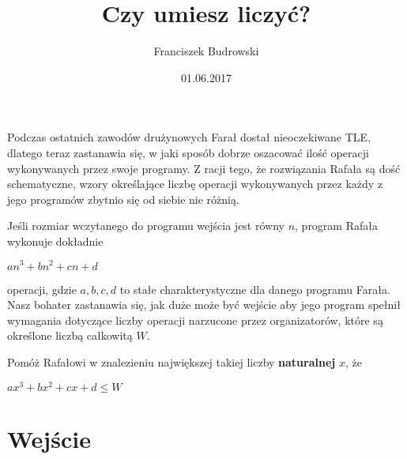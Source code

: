 \documentclass[zad,zawodnik,utf8]{sinol}
\title{Czy umiesz liczyć?}
\author{Franciszek Budrowski} %
\date{01.06.2017}
\begin{document}
\begin{tasktext}

\iffalse
\epigraph{Man wollte sie zu zwanzig Dingen \\ in einem Haus in Danzig zwingen.}{\textit{Erich Mühsam}}
Danzig sei deutsch!
Danzig, gerissen vom Mutterlande,
Stehst du allein nach der Feinde Gebot.
Danzig, du Perle am Ostseestrande,
Weh klingt deine Klage: Deutschtum in Not!
Deutschtum in Not – Danzig in Not!
Im Staube das Banner schwarz-weiß-rot! 
\fi

\iffalse
W gdańskiej fontannie Grzyb z Kaliną szukają bursztynów. Fontanna jest podzielona na $n^2$ kwadratowych segmentów. Początkowo w każdym z nich jest zero bursztynów. Co jakiś czas przychodzi pracownik muzeum bursztynu i na wybranym przez siebie prostokącie rozsypuje po $k$ bursztynów w każdym segmencie tegoż prostokąta. Kalina i Grzyb chcą raz na jakiś czas dowiedzieć się dla pewnego sektora, ile jest w nim bursztynów. 
\fi

Podczas ostatnich zawodów drużynowych Farał dostał nieoczekiwane TLE, dlatego teraz zastanawia się, w jaki sposób dobrze oszacować ilość operacji wykonywanych przez swoje programy. Z racji tego, że rozwiązania Rafała są dość schematyczne, wzory określające liczbę operacji wykonywanych przez każdy z jego programów zbytnio się od siebie nie różnią.

Jeśli rozmiar wczytanego do programu wejścia jest równy $n$, program Rafała wykonuje dokładnie
\begingroup
    \fontsize{13pt}{12pt}\selectfont
	\begin{center}
	$an^3 + bn^2 + cn + d$ 
	\end{center}
\endgroup	
operacji, gdzie $a, b, c, d$ to stałe charakterystyczne dla danego programu Farała. Nasz bohater zastanawia się, jak duże może być wejście aby jego program spełnił wymagania dotyczące liczby operacji narzucone przez organizatorów, które są określone liczbą całkowitą $W$.

Pomóż Rafałowi w znalezieniu największej takiej liczby \textbf{naturalnej} $x$, że
\begingroup
    \fontsize{13pt}{12pt}\selectfont
	\begin{center}
	$ax^3 + bx^2 + cx + d \leq W$ 
	\end{center}
\endgroup	

  \section{Wejście}


\end{tasktext}
\end{document}
